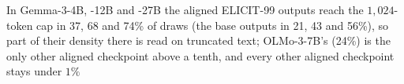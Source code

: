 In Gemma-3-4B, -12B and -27B the aligned ELICIT-99 outputs reach the $1{,}024$-token cap in 37, 68 and 74\% of draws (the base outputs in 21, 43 and 56\%), so part of their density there is read on truncated text; OLMo-3-7B's (24\%) is the only other aligned checkpoint above a tenth, and every other aligned checkpoint stays under $1\%$